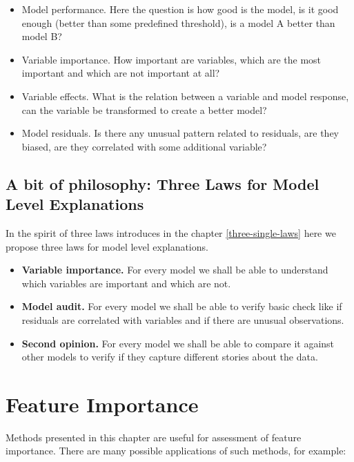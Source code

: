 \documentclass[]{krantz}
\providecommand{\tightlist}{%
  \setlength{\itemsep}{0pt}\setlength{\parskip}{0pt}}
\theoremstyle{definition}
\theoremstyle{definition}
\theoremstyle{definition}
\theoremstyle{remark}
\begin{document}
\begin{itemize}
\tightlist
\item
  Model performance. Here the question is how good is the model, is it
  good enough (better than some predefined threshold), is a model A
  better than model B?
\item
  Variable importance. How important are variables, which are the most
  important and which are not important at all?
\item
  Variable effects. What is the relation between a variable and model
  response, can the variable be transformed to create a better model?
\item
  Model residuals. Is there any unusual pattern related to residuals,
  are they biased, are they correlated with some additional variable?
\end{itemize}

\hypertarget{a-bit-of-philosophy-three-laws-for-model-level-explanations}{%
\subsection{A bit of philosophy: Three Laws for Model Level
Explanations}\label{a-bit-of-philosophy-three-laws-for-model-level-explanations}}

In the spirit of three laws introduces in the chapter
\ref{three-single-laws} here we propose three laws for model level
explanations.

\begin{itemize}
\tightlist
\item
  \textbf{Variable importance.} For every model we shall be able to
  understand which variables are important and which are not.
\item
  \textbf{Model audit.} For every model we shall be able to verify basic
  check like if residuals are correlated with variables and if there are
  unusual observations.
\item
  \textbf{Second opinion.} For every model we shall be able to compare
  it against other models to verify if they capture different stories
  about the data.
\end{itemize}

\hypertarget{variableImportance}{%
\section{Feature Importance}\label{variableImportance}}

Methods presented in this chapter are useful for assessment of feature
importance. There are many possible applications of such methods, for
example:
\end{document}
